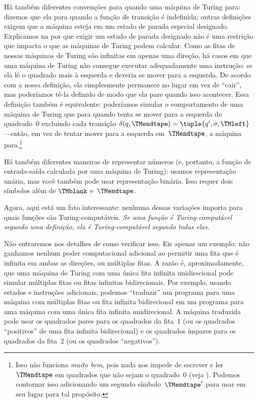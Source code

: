 \documentclass[../../../include/open-logic-section]{subfiles}
\begin{document}
Há também diferentes convenções para quando uma máquina de Turing para:
dizemos que ela para quando a função de transição é indefinida; outras
definições exigem que a máquina esteja em um estado de parada especial
designado. Explicamos na  por que exigir um
estado de parada designado não é uma restrição que impacta o que as
máquinas de Turing podem calcular.  Como as fitas de nossas máquinas de
Turing são infinitas em apenas uma direção, há casos em que uma máquina de
Turing não consegue executar adequadamente uma instrução: se ela lê o
quadrado mais à esquerda e deveria se mover para a esquerda. De acordo com a
nossa definição, ela simplesmente permanece no lugar em vez de ``cair'', mas
poderíamos tê-la definido de modo que ela pare quando isso acontecer. Essa
definição também é equivalente: poderíamos simular o comportamento de uma
máquina de Turing que para quando tenta se mover para a esquerda do
quadrado~$0$ excluindo cada transição $\delta(q,\TMendtape) =
\tuple{q',\sigma,\TMleft}$---então, em vez de tentar mover para a esquerda
em~$\TMendtape$, a máquina para.\footnote{Isso não funciona \emph{muito bem},
pois nada nos impede de escrever e ler $\TMendtape$
em quadrados que não sejam o quadrado~$0$ (veja ).
Podemos contornar isso adicionando um segundo símbolo~$\TMendtape'$ para
usar em seu lugar para tal propósito.}

Há também diferentes maneiras de representar números (e, portanto, a
função de entrada-saída calculada por uma máquina de Turing): usamos
representação unária, mas você também pode usar representação binária. Isso
requer dois símbolos além de $\TMblank$ e~$\TMendtape$.

Agora, aqui está um fato interessante: nenhuma dessas variações importa para
quais funções são Turing-computáveis. \emph{Se uma função é
Turing-computável segundo uma definição, ela é Turing-computável
segundo todas elas.}

Não entraremos nos detalhes de como verificar isso. Eis apenas um
exemplo: não ganhamos nenhum poder computacional adicional ao permitir uma
fita que é infinita em ambas as direções, ou múltiplas fitas. A razão é,
aproximadamente, que uma máquina de Turing com uma única fita infinita
unidirecional pode simular múltiplas fitas ou fitas infinitas bidirecionais.
Por exemplo, usando estados e instruções adicionais, podemos ``traduzir'' um
programa para uma máquina com múltiplas fitas ou fita infinita bidirecional
em um programa para uma máquina com uma única fita infinita unidirecional.
A máquina traduzida pode usar os quadrados pares para os quadrados da
fita~$1$ (ou os quadrados ``positivos'' de uma fita infinita bidirecional) e
os quadrados ímpares para os quadrados da fita~$2$ (ou os quadrados
``negativos'').
\end{document}
